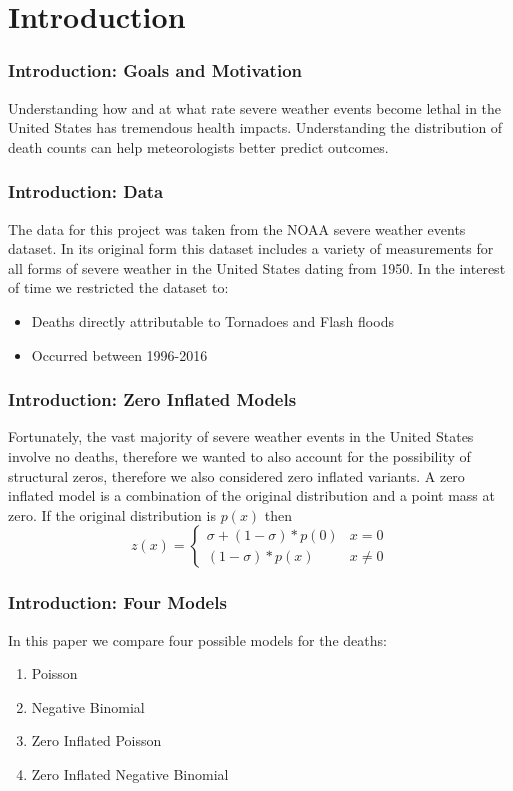 \documentclass{beamer}
\begin{document}
	\section{Introduction} 
	\begin{frame}
		\frametitle{Introduction: Goals and Motivation}
		Understanding how and at what rate severe weather events become lethal in the United States has tremendous health impacts. Understanding the distribution of death counts can help meteorologists better predict outcomes.
	\end{frame}
	\begin{frame}
		\frametitle{Introduction: Data}
		The data for this project was taken from the NOAA severe weather events dataset. 
		In its original form this dataset includes a variety of measurements for all forms of severe weather in the United States dating from 1950. In the interest of time we restricted the dataset to:
		\begin{itemize}
			\item Deaths directly attributable to Tornadoes and Flash floods 
			\item Occurred between 1996-2016
		\end{itemize}
	\end{frame}
	\begin{frame}
		\frametitle{Introduction: Zero Inflated Models}
			Fortunately, the vast majority of severe weather events in the United States involve no deaths, therefore we wanted to also account for the possibility of structural zeros, therefore we also considered zero inflated variants. A zero inflated model is a combination of the original distribution and a point mass at zero. If the original distribution is $p(x)$ then $$z(x) = \begin{cases}
			\sigma + (1-\sigma)*p(0) &x=0\\
			(1-\sigma)*p(x) &x\ne0
			\end{cases}$$
	\end{frame}
	\begin{frame}
		\frametitle{Introduction: Four Models}
				In this paper we compare four possible models for the deaths: 
				\begin{enumerate}
					\item Poisson
					\item Negative Binomial
					\item Zero Inflated Poisson
					\item Zero Inflated Negative Binomial
				\end{enumerate}
	\end{frame}
	
\end{document}
